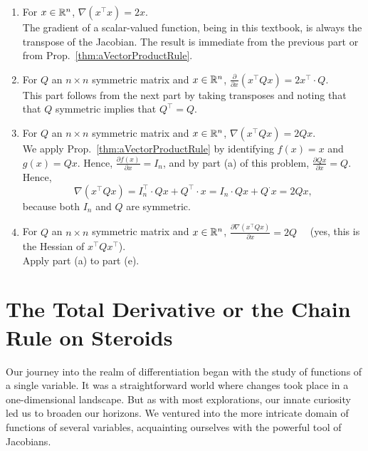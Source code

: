 \begin{enumerate}
\item For $x \in \mathbb R^{n}$, $\nabla \left( x^\top x\right) = 2 x$.\\

The gradient of a scalar-valued function, being in this textbook, is always the transpose of the Jacobian. The result is immediate from the previous part or from Prop.~\ref{thm:aVectorProductRule}.

\item For $Q$ an $n \times n$ symmetric matrix and $x \in \mathbb R^n$, $\frac{\partial }{\partial x} \left( x^\top Q x \right)= 2 x^\top \cdot Q $.\\

This part follows from the next part by taking transposes and noting that that $Q$ symmetric implies that $Q^\top = Q$.

\item For $Q$ an $n \times n$ symmetric matrix and $x \in \mathbb R^n$, $\nabla  \left(x^\top Q  x \right) = 2 Q  x$.\\

We apply Prop.~\ref{thm:aVectorProductRule} by identifying $f(x) = x$ and $g(x) =Q  x.$ Hence, $\frac{\partial f(x)}{\partial x} = I_n$, and by part (a) of this problem, $\frac{\partial Q x}{\partial x} = Q$. Hence, 
$$ \nabla \left(x^\top Q  x \right) =  I_n^\top \cdot Q x + Q^\top \cdot x = I_n\cdot Q x + Q^ \cdot x = 2 Q x,$$
because both $I_n$ and $Q$ are symmetric.

\item For $Q$ an $n \times n$ symmetric matrix and $x \in \mathbb R^n$, $\frac{\partial \nabla \left(x^\top Q  x \right)}{\partial x}  = 2 Q$ ~~(yes, this is the Hessian of $x^\top Q x^\top$).  \\

Apply part (a) to part (e). 

\end{enumerate}

\section{The Total Derivative or the Chain Rule on Steroids}
\label{sec:TotalDerivative}

Our journey into the realm of differentiation began with the study of functions of a single variable. It was a straightforward world where changes took place in a one-dimensional landscape. But as with most explorations, our innate curiosity led us to broaden our horizons. We ventured into the more intricate domain of functions of several variables, acquainting ourselves with the powerful tool of Jacobians. 


